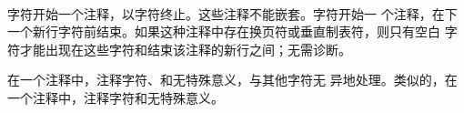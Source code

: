 \paragraph{} %
字符\tm{/*}开始一个注释，以字符\tm{*/}终止。这些注释不能嵌套。字符\tm{//}开始一
个注释，在下一个新行字符前结束。如果这种注释中存在换页符或垂直制表符，则只有空白
字符才能出现在这些字符和结束该注释的新行之间；无需诊断。

\begin{note}
  在一个\tm{//}注释中，注释字符\tm{//}、\tm{/*}和\tm{*/}无特殊意义，与其他字符无
  异地处理。类似的，在一个\tm{/*}注释中，注释字符\tm{//}和\tm{/*}无特殊意义。
\end{note}
